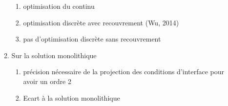 \documentclass{article}
\begin{document}
\begin{enumerate}
\begin{enumerate}
			\begin{enumerate}
				\item optimisation du continu
				\item optimisation discrète avec
					recouvrement (Wu, 2014)
				\item pas d'optimisation discrète sans
					recouvrement
			\end{enumerate}
		\item Sur la solution monolithique
			\begin{enumerate}
				\item précision nécessaire de
					la projection
					des conditions d'interface
					pour avoir un ordre 2
				\item Ecart à la solution monolithique
			\end{enumerate}


\end{enumerate}
\end{enumerate}
\end{document}
